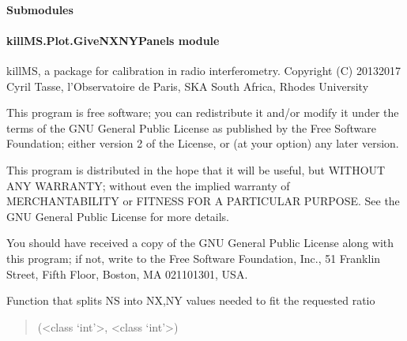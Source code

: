 \documentclass[letterpaper,10pt,english]{sphinxmanual}
\begin{document}
\paragraph{Submodules}
\label{\detokenize{api/killMS.Plot:submodules}}

\paragraph{killMS.Plot.GiveNXNYPanels module}
\label{\detokenize{api/killMS.Plot:module-killMS.Plot.GiveNXNYPanels}}\label{\detokenize{api/killMS.Plot:killms-plot-givenxnypanels-module}}
\sphinxAtStartPar
killMS, a package for calibration in radio interferometry.
Copyright (C) 2013\sphinxhyphen{}2017  Cyril Tasse, l’Observatoire de Paris,
SKA South Africa, Rhodes University

\sphinxAtStartPar
This program is free software; you can redistribute it and/or
modify it under the terms of the GNU General Public License
as published by the Free Software Foundation; either version 2
of the License, or (at your option) any later version.

\sphinxAtStartPar
This program is distributed in the hope that it will be useful,
but WITHOUT ANY WARRANTY; without even the implied warranty of
MERCHANTABILITY or FITNESS FOR A PARTICULAR PURPOSE.  See the
GNU General Public License for more details.

\sphinxAtStartPar
You should have received a copy of the GNU General Public License
along with this program; if not, write to the Free Software
Foundation, Inc., 51 Franklin Street, Fifth Floor, Boston, MA  02110\sphinxhyphen{}1301, USA.

\begin{fulllineitems}
\label{\detokenize{api/killMS.Plot:killMS.Plot.GiveNXNYPanels.GiveNXNYPanels}}
\pysigstartsignatures
{}
\pysigstopsignatures
\sphinxAtStartPar
Function that splits NS into NX,NY values
needed to fit the requested ratio
\begin{quote}\begin{description}
\sphinxAtStartPar
(\textless{}class ‘int’\textgreater{}, \textless{}class ‘int’\textgreater{})

\end{description}\end{quote}

\end{fulllineitems}
\end{document}
